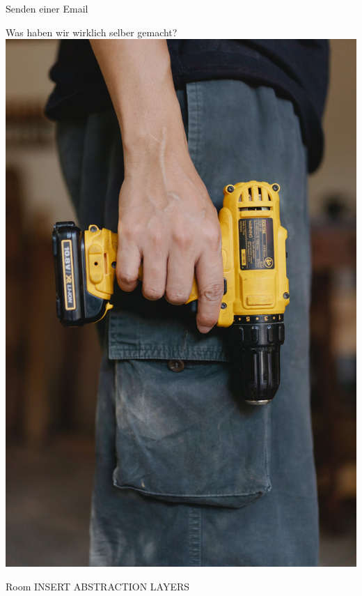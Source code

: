 \documentclass[aspectratio=169]{beamer}
\begin{document}
\begin{frame}[plain]{Senden einer Email}
    \lstset{language=Python}
    
\end{frame}

\begin{frame}[plain]{Was haben wir wirklich selber gemacht?}
\centering
\includegraphics[height=.8\textheight]{media/self.jpeg}
\end{frame}

\begin{frame}[plain]{Room}
INSERT ABSTRACTION LAYERS
\end{frame}
\end{document}
